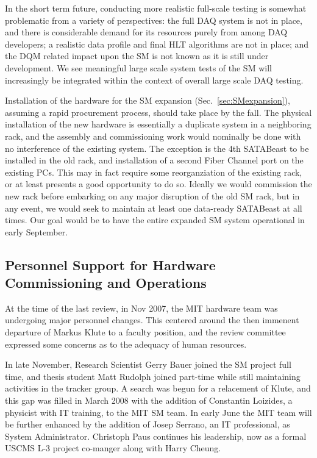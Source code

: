 In the short term future, conducting more realistic full-scale testing
is somewhat problematic from a variety of perspectives: 
the full DAQ system is not in place, 
and there is considerable demand for its resources purely from among DAQ developers;
a realistic data profile and final HLT algorithms are not in place;
and the DQM related impact upon the SM is not known as it is still under development.
We see meaningful large scale system tests of the SM will increasingly be integrated
within the context of overall large scale DAQ testing.

 
Installation of the hardware for the SM expansion (Sec.~\ref{sec:SMexpansion}), 
assuming a rapid procurement process, should take place by the fall.
The physical installation of the new hardware is essentially a duplicate
system in a neighboring rack, and the assembly and commissioning work
would nominally be done with no interference of the existing system.
The exception is the 4th SATABeast to be installed in the old rack,
and installation of a second Fiber Channel port on the existing PCs.
This may in fact require some reorganziation of the existing rack, 
or at least presents a good opportunity to do so.
Ideally we would commission the new rack before embarking on any major
disruption of the old SM rack, but in any event, we would seek to maintain
at least one data-ready SATABeast at all times.
Our goal would be to have the entire expanded SM system operational
in early September.


\subsection{Personnel Support for Hardware Commissioning and Operations}

At the time of the last review, in Nov 2007, the MIT hardware team 
was undergoing major personnel changes.
This centered around the then immenent departure of Markus Klute
to a faculty position, and the review committee expressed
some concerns as to the adequacy of human resources.


In late November, Research Scientist Gerry Bauer joined the SM project
full time, and thesis student Matt Rudolph joined part-time while still maintaining
activities in the tracker group.
A search was begun for a relacement of Klute, and this gap was
filled in March 2008 with the addition of Constantin Loizides,
a physicist with IT training, to the  MIT SM team. 
In early June the MIT team will be further enhanced by the addition
of Josep Serrano, an IT professional, as System Administrator.
Christoph Paus continues his leadership, now as a formal USCMS 
L-3 project co-manger along with Harry Cheung.


